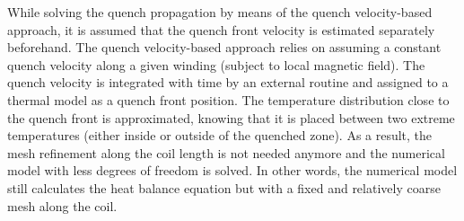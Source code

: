While solving the quench propagation by means of the quench velocity-based approach, it is assumed that the quench front velocity is estimated separately beforehand. The quench velocity-based approach relies on assuming a constant quench velocity along a given winding (subject to local magnetic field). The quench velocity is integrated with time by an external routine and assigned to a thermal model as a quench front position. The temperature distribution close to the quench front is approximated, knowing that it is placed between two extreme temperatures (either inside or outside of the quenched zone). As a result, the mesh refinement along the coil length is not needed anymore and the numerical model with less degrees of freedom is solved. In other words, the numerical model still calculates the heat balance equation but with a fixed and relatively coarse mesh along the coil. 
